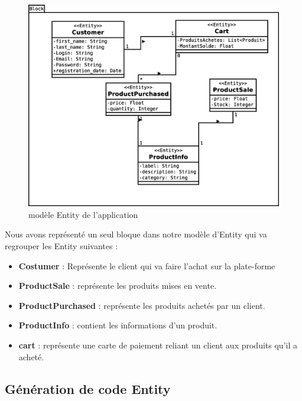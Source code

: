 \begin{figure}[H]
  \centering
  \includegraphics[scale=.4]{img/Entitymodel.eps}
  \caption{modèle Entity de l'application}
  \label{fig:entMod}
\end{figure}

Nous avons représenté un seul bloque dans notre modèle d'Entity qui va regrouper les Entity suivantes :  

\begin{itemize}
  \item[\textbullet] \textbf{Costumer} : Représente le client qui va faire l'achat sur la plate-forme
  \item[\textbullet] \textbf{ProductSale} : représente les produits mises en vente.
  \item[\textbullet]	\textbf{ProductPurchased} : représente les produits achetés par un client.
  \item[\textbullet] \textbf{ProductInfo} : contient les informations d'un produit.
  \item[\textbullet] \textbf{cart} : représente une carte de paiement reliant un client aux produits qu'il a acheté.
   
\end{itemize}

\subsection*{Génération de code Entity}





\clearpage



